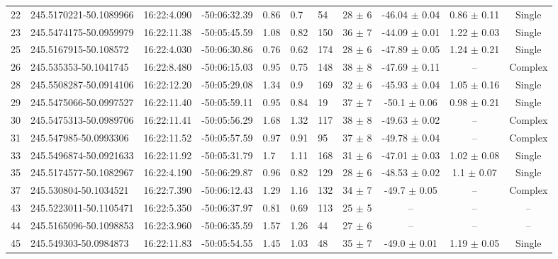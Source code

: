 \documentclass[longauth]{aa} %
\begin{document}
\begin{appendix}
\begin{table}[htbp!]
\begin{tabular}{llllllllccc}
22  &  245.5170221-50.1089966  &  16:22:4.090  &  -50:06:32.39  &  0.86  &  0.7  &  54  &  28 $\pm$ 6  &  -46.04 $\pm$ 0.04  &  0.86 $\pm$ 0.11  &  Single \\
23  &  245.5474175-50.0959979  &  16:22:11.38  &  -50:05:45.59  &  1.08  &  0.82  &  150  &  36 $\pm$ 7  &  -44.09 $\pm$ 0.01  &  1.22 $\pm$ 0.03  &  Single \\
25  &  245.5167915-50.108572  &  16:22:4.030  &  -50:06:30.86  &  0.76  &  0.62  &  174  &  28 $\pm$ 6  &  -47.89 $\pm$ 0.05  &  1.24 $\pm$ 0.21  &  Single \\
26  &  245.535353-50.1041745  &  16:22:8.480  &  -50:06:15.03  &  0.95  &  0.75  &  148  &  38 $\pm$ 8  &  -47.69 $\pm$ 0.11  &  --  &  Complex \\
28  &  245.5508287-50.0914106  &  16:22:12.20  &  -50:05:29.08  &  1.34  &  0.9  &  169  &  32 $\pm$ 6  &  -45.93 $\pm$ 0.04  &  1.05 $\pm$ 0.16  &  Single \\
29  &  245.5475066-50.0997527  &  16:22:11.40  &  -50:05:59.11  &  0.95  &  0.84  &  19  &  37 $\pm$ 7  &  -50.1 $\pm$ 0.06  &  0.98 $\pm$ 0.21  &  Single \\
30  &  245.5475313-50.0989706  &  16:22:11.41  &  -50:05:56.29  &  1.68  &  1.32  &  117  &  38 $\pm$ 8  &  -49.63 $\pm$ 0.02  &  --  &  Complex \\
31  &  245.547985-50.0993306  &  16:22:11.52  &  -50:05:57.59  &  0.97  &  0.91  &  95  &  37 $\pm$ 8  &  -49.78 $\pm$ 0.04  &  --  &  Complex \\
33  &  245.5496874-50.0921633  &  16:22:11.92  &  -50:05:31.79  &  1.7  &  1.11  &  168  &  31 $\pm$ 6  &  -47.01 $\pm$ 0.03  &  1.02 $\pm$ 0.08  &  Single \\
35  &  245.5174577-50.1082967  &  16:22:4.190  &  -50:06:29.87  &  0.96  &  0.82  &  129  &  28 $\pm$ 6  &  -48.53 $\pm$ 0.02  &  1.1 $\pm$ 0.07  &  Single \\
37  &  245.530804-50.1034521  &  16:22:7.390  &  -50:06:12.43  &  1.29  &  1.16  &  132  &  34 $\pm$ 7  &  -49.7 $\pm$ 0.05  &  --  &  Complex \\
43  &  245.5223011-50.1105471  &  16:22:5.350  &  -50:06:37.97  &  0.81  &  0.69  &  113  &  25 $\pm$ 5  &  --  &  --  &  -- \\
44  &  245.5165096-50.1098853  &  16:22:3.960  &  -50:06:35.59  &  1.57  &  1.26  &  44  &  27 $\pm$ 6  &  --  &  --  &  -- \\
45  &  245.549303-50.0984873  &  16:22:11.83  &  -50:05:54.55  &  1.45  &  1.03  &  48  &  35 $\pm$ 7  &  -49.0 $\pm$ 0.01  &  1.19 $\pm$ 0.05  &  Single \\

\end{tabular}
\end{table}
\end{appendix}
\end{document}
